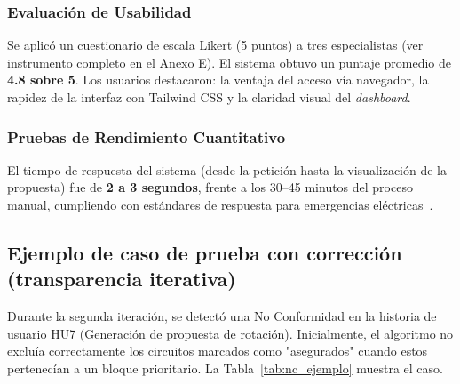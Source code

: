 \subsubsection{Evaluación de Usabilidad}
Se aplicó un cuestionario de escala Likert (5 puntos) a tres especialistas (ver instrumento completo en el Anexo E). El sistema obtuvo un puntaje promedio de \textbf{4.8 sobre 5}. Los usuarios destacaron: la ventaja del acceso vía navegador, la rapidez de la interfaz con Tailwind CSS y la claridad visual del \textit{dashboard}.

\subsubsection{Pruebas de Rendimiento Cuantitativo}
El tiempo de respuesta del sistema (desde la petición hasta la visualización de la propuesta) fue de \textbf{2 a 3 segundos}, frente a los 30–45 minutos del proceso manual, cumpliendo con estándares de respuesta para emergencias eléctricas~\citep{zhou2023}.

\subsection{Ejemplo de caso de prueba con corrección (transparencia iterativa)}

Durante la segunda iteración, se detectó una No Conformidad en la historia de usuario HU7 (Generación de propuesta de rotación). Inicialmente, el algoritmo no excluía correctamente los circuitos marcados como "asegurados" cuando estos pertenecían a un bloque prioritario. La Tabla~\ref{tab:nc_ejemplo} muestra el caso.

